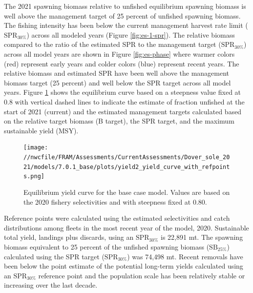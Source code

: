 \documentclass[11pt,
  english,
  a4paper,
]{article}
\begin{document}
The 2021 spawning biomass relative to unfished equilibrium spawning biomass is well above the management target of 25 percent of unfished spawning biomass. The fishing intensity has been below the current management harvest rate limit ({\(\text{SPR}_{30\%}\)\leavevmode\tagmcend\tagstructend}) across all modeled years (Figure \ref{fig:es-1-spr}). The relative biomass compared to the ratio of the estimated SPR to the management target ({\(\text{SPR}_{30\%}\)\leavevmode\tagmcend\tagstructend}) across all model years are shown in Figure \ref{fig:es-phase} where warmer colors (red) represent early years and colder colors (blue) represent recent years. The relative biomass and estimated SPR have been well above the management biomass target (25 percent) and well below the SPR target across all model years. Figure \ref{fig:es-yield} shows the equilibrium curve based on a steepness value fixed at 0.8 with vertical dashed lines to indicate the estimate of fraction unfished at the start of 2021 (current) and the estimated management targets calculated based on the relative target biomass (B target), the SPR target, and the maximum sustainable yield (MSY).

\leavevmode\tagmcend\tagstructend\par


\begin{figure}
\centering
\texttt{[image: //nwcfile/FRAM/Assessments/CurrentAssessments/Dover\_sole\_2021/models/7.0.1\_base/plots/yield2\_yield\_curve\_with\_refpoints.png]}
\caption{Equilibrium yield curve for the base case model. Values are based on the 2020 fishery selectivities and with steepness fixed at 0.80.\label{fig:es-yield}}
\end{figure}

\tagmcend\tagstructend


Reference points were calculated using the estimated selectivities and catch distributions among fleets in the most recent year of the model, 2020. Sustainable total yield, landings plus discards, using an {\(\text{SPR}_{30\%}\)\leavevmode\tagmcend\tagstructend} is 22,891 mt. The spawning biomass equivalent to 25 percent of the unfished spawning biomass ({\(\text{SB}_{25\%}\)\leavevmode\tagmcend\tagstructend}) calculated using the SPR target ({\(\text{SPR}_{30\%}\)\leavevmode\tagmcend\tagstructend}) was 74,498 mt. Recent removals have been below the point estimate of the potential long-term yields calculated using an {\(\text{SPR}_{30\%}\)\leavevmode\tagmcend\tagstructend} reference point and the population scale has been relatively stable or increasing over the last decade.
\end{document}
